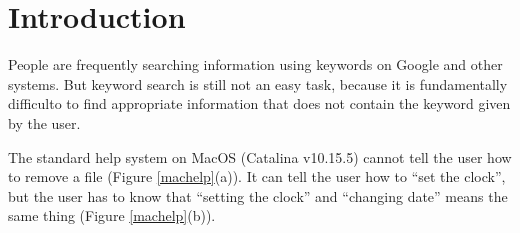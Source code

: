 \documentclass[manuscript,anonymous,review]{acmart}
\begin{document}




\maketitle

\section{Introduction}

People are frequently searching information using keywords on Google
and other systems.
But keyword search is still not an easy task,
because it is fundamentally difficulto to find appropriate information
that does not contain the keyword given by the user.


The standard help system on MacOS (Catalina v10.15.5)
cannot tell the user how to remove a file (Figure \ref{machelp}(a)).
%
It can tell the user how to ``set the clock'', but
the user has to know that
``setting the clock'' and ``changing date'' means the same thing (Figure \ref{machelp}(b)).
\end{document}
